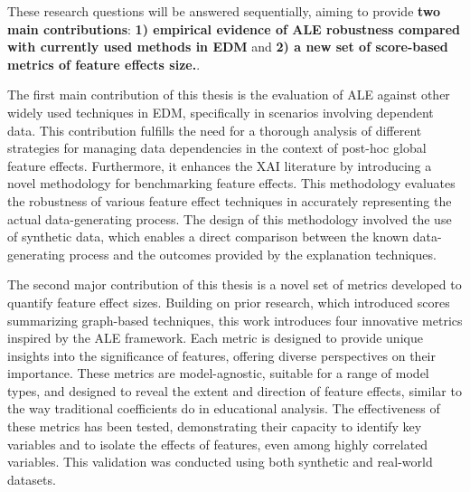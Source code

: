 These research questions will be answered sequentially, aiming to provide  \textbf{two main contributions}: \textbf{1) empirical evidence of \gls{ALE} robustness compared with currently used methods in \gls{EDM}} and \textbf{2) a new set of score-based metrics of feature effects size.}. 

The first main contribution of this thesis is the evaluation of \gls{ALE} against other widely used techniques in \gls{EDM}, specifically in scenarios involving dependent data. This contribution fulfills the need for a thorough analysis of different strategies for managing data dependencies in the context of post-hoc global feature effects. Furthermore, it enhances the \gls{XAI} literature by introducing a novel methodology for benchmarking feature effects. This methodology evaluates the robustness of various feature effect techniques in accurately representing the actual data-generating process. The design of this methodology involved the use of synthetic data, which enables a direct comparison between the known data-generating process and the outcomes provided by the explanation techniques.

 The second major contribution of this thesis is a novel set of metrics developed to quantify feature effect sizes. Building on prior research, which introduced scores summarizing graph-based techniques, \cite{long1997regression, Greenwell2018AMeasure, Lee2023SHAPForecasting} this work introduces four innovative metrics inspired by the \gls{ALE} framework. Each metric is designed to provide unique insights into the significance of features, offering diverse perspectives on their importance. These metrics are model-agnostic, suitable for a range of model types, and designed to reveal the extent and direction of feature effects, similar to the way traditional coefficients do in educational analysis. The effectiveness of these metrics has been tested, demonstrating their capacity to identify key variables and to isolate the effects of features, even among highly correlated variables. This validation was conducted using both synthetic and real-world datasets.

